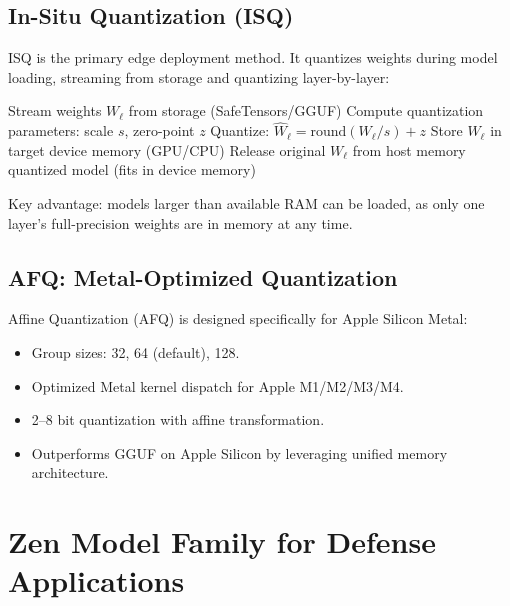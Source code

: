\documentclass[11pt,letterpaper]{article}
\begin{document}
\subsection{In-Situ Quantization (ISQ)}

ISQ is the primary edge deployment method. It quantizes weights during model loading, streaming from storage and quantizing layer-by-layer:

\begin{algorithm}[H]
\caption{In-Situ Quantization Loading}
\begin{algorithmic}[1]
  \State Stream weights $W_\ell$ from storage (SafeTensors/GGUF)
  \State Compute quantization parameters: scale $s$, zero-point $z$
  \State Quantize: $\hat{W}_\ell = \text{round}(W_\ell / s) + z$
  \State Store $\hat{W}_\ell$ in target device memory (GPU/CPU)
  \State Release original $W_\ell$ from host memory
\EndFor
\State \Return quantized model (fits in device memory)
\end{algorithmic}
\end{algorithm}

Key advantage: models larger than available RAM can be loaded, as only one layer's full-precision weights are in memory at any time.

\subsection{AFQ: Metal-Optimized Quantization}

Affine Quantization (AFQ) is designed specifically for Apple Silicon Metal:
\begin{itemize}
\item Group sizes: 32, 64 (default), 128.
\item Optimized Metal kernel dispatch for Apple M1/M2/M3/M4.
\item 2--8 bit quantization with affine transformation.
\item Outperforms GGUF on Apple Silicon by leveraging unified memory architecture.
\end{itemize}

\section{Zen Model Family for Defense Applications}
\end{document}
